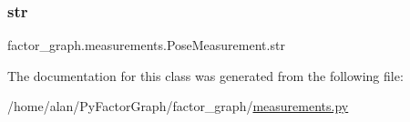 \subsubsection{\texorpdfstring{str}{str}}
{\footnotesize\ttfamily factor\+\_\+graph.\+measurements.\+Pose\+Measurement.\+str\hspace{0.3cm}{\ttfamily [static]}}



The documentation for this class was generated from the following file\+:\begin{DoxyCompactItemize}
\item
/home/alan/\+Py\+Factor\+Graph/factor\+\_\+graph/\hyperlink{measurements_8py}{measurements.\+py}\end{DoxyCompactItemize}
